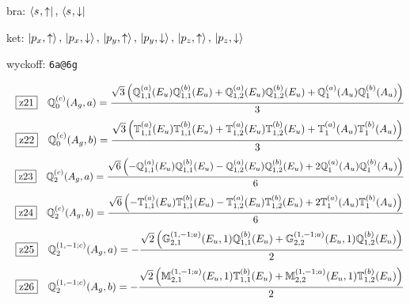 \documentclass[fleqn,10pt,landscape]{jsarticle}
\begin{document}
\noindent\quad * bra: $\bra{s_{},\uparrow},\, \bra{s_{},\downarrow}$

\noindent\quad * ket: $\ket{p_{x},\uparrow},\, \ket{p_{x},\downarrow},\, \ket{p_{y},\uparrow},\, \ket{p_{y},\downarrow},\, \ket{p_{z},\uparrow},\, \ket{p_{z},\downarrow}$

\noindent\quad * wyckoff: \texttt{6a@6g}

\begin{dmath*}
\hspace*{3mm}\fbox{z21}\quad \mathbb{Q}_{0}^{(c)}(A_{g},a)=\frac{\sqrt{3} \left(\mathbb{Q}_{1,1}^{(a)}(E_{u}) \mathbb{Q}_{1,1}^{(b)}(E_{u}) + \mathbb{Q}_{1,2}^{(a)}(E_{u}) \mathbb{Q}_{1,2}^{(b)}(E_{u}) + \mathbb{Q}_{1}^{(a)}(A_{u}) \mathbb{Q}_{1}^{(b)}(A_{u})\right)}{3}
\end{dmath*}
\begin{dmath*}
\hspace*{3mm}\fbox{z22}\quad \mathbb{Q}_{0}^{(c)}(A_{g},b)=\frac{\sqrt{3} \left(\mathbb{T}_{1,1}^{(a)}(E_{u}) \mathbb{T}_{1,1}^{(b)}(E_{u}) + \mathbb{T}_{1,2}^{(a)}(E_{u}) \mathbb{T}_{1,2}^{(b)}(E_{u}) + \mathbb{T}_{1}^{(a)}(A_{u}) \mathbb{T}_{1}^{(b)}(A_{u})\right)}{3}
\end{dmath*}
\begin{dmath*}
\hspace*{3mm}\fbox{z23}\quad \mathbb{Q}_{2}^{(c)}(A_{g},a)=\frac{\sqrt{6} \left(- \mathbb{Q}_{1,1}^{(a)}(E_{u}) \mathbb{Q}_{1,1}^{(b)}(E_{u}) - \mathbb{Q}_{1,2}^{(a)}(E_{u}) \mathbb{Q}_{1,2}^{(b)}(E_{u}) + 2 \mathbb{Q}_{1}^{(a)}(A_{u}) \mathbb{Q}_{1}^{(b)}(A_{u})\right)}{6}
\end{dmath*}
\begin{dmath*}
\hspace*{3mm}\fbox{z24}\quad \mathbb{Q}_{2}^{(c)}(A_{g},b)=\frac{\sqrt{6} \left(- \mathbb{T}_{1,1}^{(a)}(E_{u}) \mathbb{T}_{1,1}^{(b)}(E_{u}) - \mathbb{T}_{1,2}^{(a)}(E_{u}) \mathbb{T}_{1,2}^{(b)}(E_{u}) + 2 \mathbb{T}_{1}^{(a)}(A_{u}) \mathbb{T}_{1}^{(b)}(A_{u})\right)}{6}
\end{dmath*}
\begin{dmath*}
\hspace*{3mm}\fbox{z25}\quad \mathbb{Q}_{2}^{(1,-1;c)}(A_{g},a)=- \frac{\sqrt{2} \left(\mathbb{G}_{2,1}^{(1,-1;a)}(E_{u},1) \mathbb{Q}_{1,1}^{(b)}(E_{u}) + \mathbb{G}_{2,2}^{(1,-1;a)}(E_{u},1) \mathbb{Q}_{1,2}^{(b)}(E_{u})\right)}{2}
\end{dmath*}
\begin{dmath*}
\hspace*{3mm}\fbox{z26}\quad \mathbb{Q}_{2}^{(1,-1;c)}(A_{g},b)=- \frac{\sqrt{2} \left(\mathbb{M}_{2,1}^{(1,-1;a)}(E_{u},1) \mathbb{T}_{1,1}^{(b)}(E_{u}) + \mathbb{M}_{2,2}^{(1,-1;a)}(E_{u},1) \mathbb{T}_{1,2}^{(b)}(E_{u})\right)}{2}
\end{dmath*}
\end{document}
